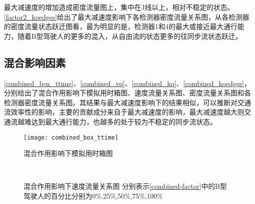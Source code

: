 最大减速度的增加造成密度流量图上，集中在J线以上，相对不稳定的状态。\autoref{factor2_kqedges}给出了最大减速度影响下各检测器密度流量关系图，从各检测器的密度流量状态跃迁图看，最为明显的是，检测器1和4的最大或接近最大通行能力，随着B型驾驶人的更多的混入，从自由流的状态更多的往同步流状态跃迁。


\subsection{混合影响因素}

\autoref{combined_box_ttime}、\autoref{combined_vq}、\autoref{combined_kq}、\autoref{combined_kqedges}，分别给出了混合作用影响下模拟用时箱图、速度流量关系图、密度流量关系图和各检测器密度流量关系图。其结果与最大减速度影响下的结果相似，可以推断对交通流效率性的影响，主要的贡献成分来自于最大减速度的影响，最大减速度越大则交通流越难达到最大通行能力，也越多的处于较为不稳定的同步流状态。

\begin{figure}[H]
\begin{center}
\texttt{[image: combined\_box\_ttime]}
\caption{混合作用影响下模拟用时箱图}
\label{combined_box_ttime}
\end{center}
\end{figure}



\begin{figure}[H]%
\centering
{}%
\\%
%
\caption[A set of four sub-floats.]{混合作用影响下速度流量关系图
分别表示\autoref{combined-factor}中的B型驾驶人的百分比分别为0\%,25\%,50\%,75\%,100\%}%
\label{combined_vq}%
\end{figure}


